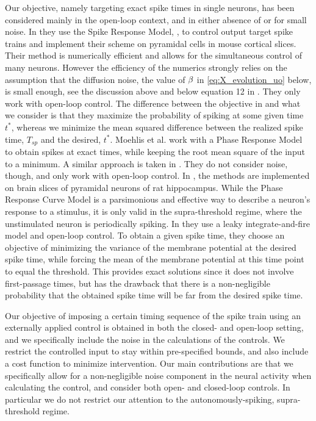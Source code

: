 \documentclass[12pt]{iopart}
\begin{document}
Our objective, namely targeting exact spike times in single neurons, has been
considered mainly in the open-loop context, and in either absence of or for
small noise. In \cite{Ahmadian2011} they use the Spike Response Model,
\cite{Gerstner2002}, to control output target spike trains and implement their
scheme on pyramidal cells in mouse cortical slices. Their method is numerically
efficient and allows for the simultaneous control of many neurons. However the
efficiency of the numerics strongly relies on the assumption that the diffusion
noise, the value of ${\beta}$ in \cref{eq:X_evolution_uo} below, is small enough, see
the discussion above and below equation 12 in \cite{Ahmadian2011}. They only
work with open-loop control. The difference between the objective in
\cite{Ahmadian2011} and what we consider is that they maximize the probability
of spiking at some given time $t^*$, whereas we minimize the mean squared
difference between the realized spike time, $T_{sp}$ and the desired, $t^*$.
Moehlis et al. \cite{Moehlis2006} work with a Phase Response Model to obtain
spikes at exact times, while keeping the root mean square of the input to a
minimum. A similar approach is taken in \cite{Dasanayake2011}. They do not
consider noise, though, and only work with open-loop control. In
\cite{Nabi2013}, the methods are implemented on brain slices of pyramidal
neurons of rat hippocampus. While the
Phase Response Curve Model is a parsimonious and effective way to describe a
neuron's response to a stimulus, it is only valid in the supra-threshold regime,
where the unstimulated neuron is periodically spiking. In \cite{Feng2003} they
use a leaky integrate-and-fire model and open-loop control. To
obtain a given spike time, they choose an objective of minimizing the
variance of the membrane potential at the desired spike time, while forcing the mean of
the membrane potential at this time point to equal the threshold. This provides
exact solutions since it does not involve first-passage times, but has the
drawback that there is a non-negligible probability that the obtained
spike time will be far from the desired spike time. 

Our objective of imposing a certain timing sequence of the spike train using an
externally applied control is obtained in both the closed- and
open-loop setting, and we specifically include the noise in the
calculations of the controls. We restrict the controlled input to stay
within pre-specified bounds, and also include a cost function to
minimize intervention.
Our main contributions are that we specifically allow for a non-negligible
noise component in the neural activity when calculating the control, and
consider both open- and closed-loop controls. In particular we do not
restrict our attention to the autonomously-spiking, supra-threshold regime. 
\end{document}
